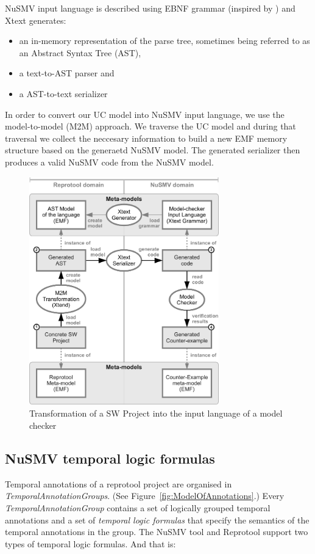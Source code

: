 NuSMV input language is described using EBNF grammar (inspired by \cite{googlecode-nusmv-tools}) and Xtext generates:
\begin{itemize}
  \item an in-memory representation of the parse tree, sometimes being referred to as an Abstract Syntax Tree (AST),
  \item a text-to-AST parser and
  \item a AST-to-text serializer
\end{itemize}

In order to convert our UC model into NuSMV input language, we use the model-to-model (M2M) approach.
We traverse the UC model and during that traversal we collect the neccesary information to build a new EMF memory structure based on the generaetd NuSMV model.
The generated serializer then produces a valid NuSMV code from the NuSMV model.

\begin{figure}[ht]
  \centering
  \includegraphics[height=280pt]{images/XtextWorkflow}
  \caption{Transformation of a SW Project into the input language of a model checker}
  \label{fig:XtextWorkflow}
\end{figure}
\pagebreak

\subsection{NuSMV temporal logic formulas}

Temporal annotations of a reprotool project are organised in \emph{TemporalAnnotationGroups}. (See Figure~\ref{fig:ModelOfAnnotations}.)
Every \emph{TemporalAnnotationGroup} contains a set of logically grouped temporal annotations and a set of \emph{temporal logic formulas}
that specify the semantics of the temporal annotations in the group. The NuSMV tool and Reprotool support two types of temporal logic
formulas. And that is:

